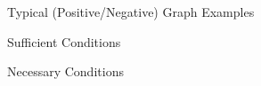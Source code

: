 \begin{frame}{}
  \begin{center}
    Typical (Positive/Negative) Graph Examples

    \vspace{1.00cm}
    Sufficient Conditions

    \vspace{1.00cm}
    Necessary Conditions
  \end{center}
\end{frame}



